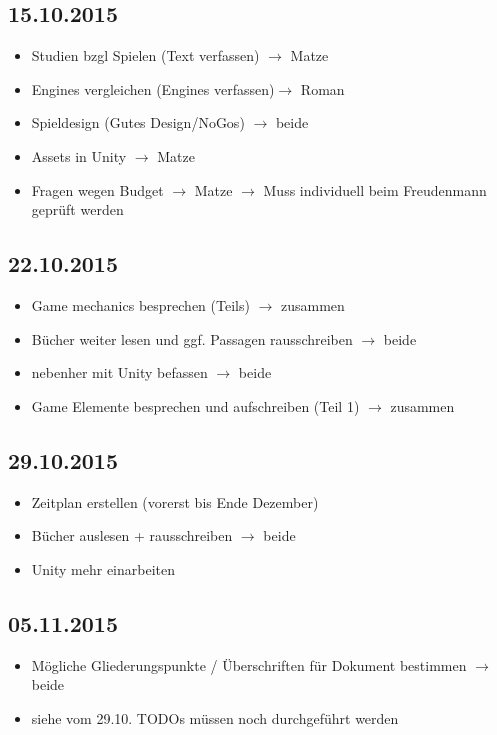 \subsection{15.10.2015}
\begin{itemize}
\item \circledmark\quad  Studien bzgl Spielen (Text verfassen) $\rightarrow$ Matze
\item \circledmark\quad  Engines vergleichen (Engines verfassen)$\rightarrow$ Roman
\item \circledmark\quad  Spieldesign (Gutes Design/NoGos) $\rightarrow$ beide
\item \circledmark\quad  Assets in Unity $\rightarrow$ Matze
\item \circledmark\quad Fragen wegen Budget $\rightarrow$ Matze $\rightarrow$ Muss individuell beim Freudenmann geprüft werden
\end{itemize}

\subsection{22.10.2015}
\begin{itemize}
\item \circledmark\quad Game mechanics besprechen (Teils) $\rightarrow$ zusammen
\item \circledmark\quad Bücher weiter lesen und ggf. Passagen rausschreiben $\rightarrow$ beide
\item \circledmark\quad nebenher mit Unity befassen $\rightarrow$ beide
\item \circledmark\quad Game Elemente besprechen und aufschreiben (Teil 1) $\rightarrow$ zusammen
\end{itemize}

\subsection{29.10.2015}
\begin{itemize}
\item \circledmark\quad  Zeitplan erstellen (vorerst bis Ende Dezember)
\item \circledmark\quad  Bücher auslesen + rausschreiben $\rightarrow$ beide
\item Unity mehr einarbeiten
\end{itemize}

\subsection{05.11.2015}
\begin{itemize}
\item \circledmark\quad Mögliche Gliederungspunkte / Überschriften für Dokument bestimmen $\rightarrow$ beide
\item siehe vom 29.10. TODOs müssen noch durchgeführt werden
\end{itemize}

